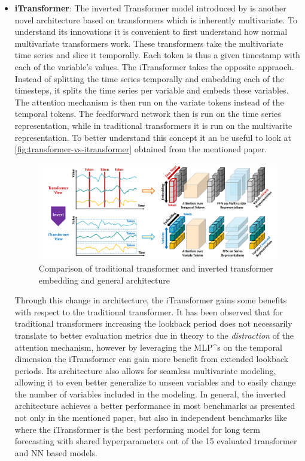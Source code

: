 \begin{itemize}
    \item \textbf{iTransformer}: The inverted Transformer model introduced by \cite{liu_hu_zhang_wu_wang_ma_long_2023} is another novel architecture based on transformers which is inherently multivariate. To understand its innovations it is convenient to first understand how normal multivariate transformers work. These transformers take the multivariate time series and slice it temporally. Each token is thus a given timestamp with each of the variable's values. The iTransformer takes the opposite appraoch. Instead of splitting the time series temporally and embedding each of the timesteps, it splits the time series per variable and embeds these variables. The attention mechanism is then run on the variate tokens instead of the temporal tokens. The feedforward network then is run on the time series representation, while in traditional transformers it is run on the multivarite representation. To better understand this concept it an be useful to look at \autoref{fig:transformer-vs-itransformer} obtained from the mentioned paper.
    \begin{figure}[ht]
        \centering
        \captionsetup{justification=centering}
        \includegraphics[width=\linewidth]{assets/transformer-vs-itransformer.png}
        \caption{Comparison of traditional transformer and inverted transformer embedding and general architecture}
        \label{fig:transformer-vs-itransformer}
    \end{figure}
    Through this change in architecture, the iTransformer gains some benefits with respect to the traditional transformer. It has been observed that for traditional transformers increasing the lookback period does not necessarily translate to better evaluation metrics due in theory to the \textit{distraction} of the attention mechanism, however by leveraging the MLP^s on the temporal dimension the iTransformer can gain more benefit from extended lookback periods. Its architecture also allows for seamless multivariate modeling, allowing it to even better generalize to unseen variables and to easily change the number of variables included in the modeling. In general, the inverted architecture achieves a better performance in most benchmarks as presented not only in the mentioned paper, but also in independent benchmarks like \cite{wang2024tssurvey} where the iTransformer is the best performing model for long term forecasting with shared hyperparameters out of the 15 evaluated transformer and NN based models.


\end{itemize}
